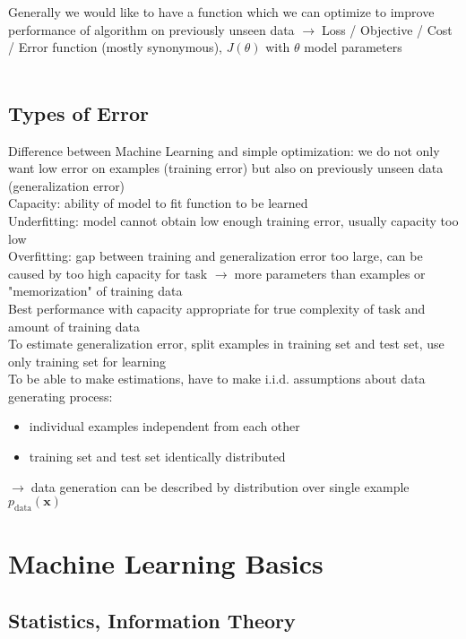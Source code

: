 \documentclass{article}
\newcommand{\arrow}{$\rightarrow\;$}
\renewcommand{\v}{\bm}
\newcommand{\p}[1]{p_\text{#1}}
\begin{document}
Generally we would like to have a function which we can optimize to improve
performance of algorithm on previously unseen data \arrow Loss / Objective / Cost / Error function (mostly synonymous), $J(\theta)$
with $\theta$ model parameters\\
\\

\subsection{Types of Error}
Difference between Machine Learning and simple optimization: we do not only want low error on examples (training error) but also on 
previously unseen data (generalization error) \\
Capacity: ability of model to fit function to be learned \\
Underfitting: model cannot obtain low enough training error, usually capacity too low \\
Overfitting: gap between training and generalization error too large, can be caused by too high capacity for task
\arrow more parameters than examples or "memorization" of training data \\
Best performance with capacity appropriate for true complexity of task and amount of training data \\

To estimate generalization error, split examples in training set and test set, use only training set for learning \\
To be able to make estimations, have to make i.i.d. assumptions about data generating process:
\begin{itemize}
    \item individual examples independent from each other
    \item training set and test set identically distributed
\end{itemize}
\arrow data generation can be described by distribution over single example $\p{data}(\v{x})$ \\

\section{Machine Learning Basics}
\subsection{Statistics, Information Theory}
\end{document}
